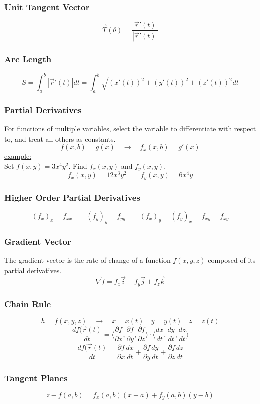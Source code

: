 \documentclass[11pt]{article}
\begin{document}
\subsubsection{Unit Tangent Vector}
$$\vec{T}(\theta) = \frac{\vec{r}'(t)}{|\vec{r}'(t)|}$$
\subsubsection{Arc Length}
$$ S = \int_{a}^{b} |\vec{r}'(t)|dt = \int_{a}^{b} \sqrt{(x'(t))^2 + (y'(t))^2 + (z'(t))^2} dt
$$
\subsubsection{Partial Derivatives}
For functions of multiple variables, select the variable to differentiate with respect to, and treat all others as constants.
$$
f(x, b) = g(x) \quad \rightarrow \quad f_x(x, b) = g'(x)
$$
\medskip
\underline{example:} \\
Set $ f(x, y) = 3x^4y^2$. Find $f_x(x, y)$ and $f_y(x, y)$.
$$ f_x(x, y) = 12x^3y^2 \quad \quad f_y(x, y) = 6x^4y$$
\subsubsection{Higher Order Partial Derivatives}
$$(f_{x})_x = f_{xx} \quad \quad (f_{y})_y = f_{yy} \quad \quad (f_{x})_y = (f_{y})_x  = f_{xy} = f_{xy}$$
\subsubsection{Gradient Vector}
The gradient vector is the rate of change of a function $f(x,y,z)$ composed of its partial derivatives.
$$ \vec{\nabla}f = f_x\vec{i} + f_y\vec{j} + f_z\vec{k} $$
\subsubsection{Chain Rule}
$$ h = f(x,y,z) \quad \rightarrow \quad x=x(t) \quad y = y(t) \quad z = z(t)$$
$$ \frac{df(\vec{r}(t)}{dt} = \langle\frac{\partial f}{\partial x}, \frac{\partial f}{\partial y}, \frac{\partial f}{\partial z}\rangle \cdot \langle\frac{dx}{dt}, \frac{dy}{dt}, \frac{dz}{dt}\rangle
$$
$$ \frac{df(\vec{r}(t)}{dt} = \frac{\partial f}{\partial x}\frac{dx}{dt} + \frac{\partial f}{\partial y} \frac{dy}{dt} + \frac{\partial f}{\partial z}\frac{dz}{dt}
$$

\subsubsection{Tangent Planes}
$$ z - f(a,b) = f_x(a,b)(x-a) + f_y(a,b)(y-b)$$
\end{document}
